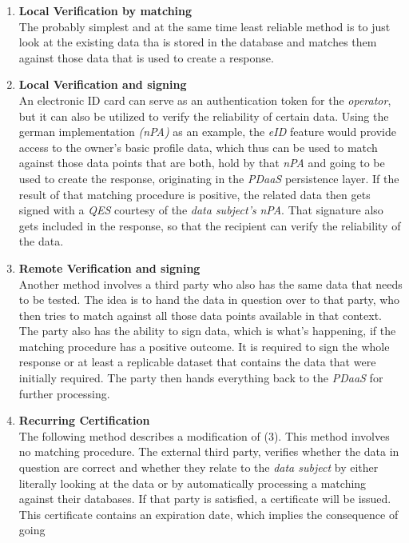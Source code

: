 \documentclass[12pt,english,a4paper,titlepage,cleardoublepage=empty,dottedtoc]{report}
\begin{document}
\begin{enumerate}
\def\labelenumi{(\arabic{enumi})}
\item
  \textbf{Local Verification by matching}\\
  The probably simplest and at the same time least reliable method is to
  just look at the existing data tha is stored in the database and
  matches them against those data that is used to create a response.
\item
  \textbf{Local Verification and signing}\\
  An electronic ID card can serve as an authentication token for the
  \emph{operator}, but it can also be utilized to verify the reliability
  of certain data. Using the german implementation \emph{(nPA)} as an
  example, the \emph{eID} feature would provide access to the owner's
  basic profile data, which thus can be used to match against those data
  points that are both, hold by that \emph{nPA} and going to be used to
  create the response, originating in the \emph{PDaaS} persistence
  layer. If the result of that matching procedure is positive, the
  related data then gets signed with a \emph{QES} courtesy of the
  \emph{data subject's} \emph{nPA}. That signature also gets included in
  the response, so that the recipient can verify the reliability of the
  data.
\item
  \textbf{Remote Verification and signing}\\
  Another method involves a third party who also has the same data that
  needs to be tested. The idea is to hand the data in question over to
  that party, who then tries to match against all those data points
  available in that context. The party also has the ability to sign
  data, which is what's happening, if the matching procedure has a
  positive outcome. It is required to sign the whole response or at
  least a replicable dataset that contains the data that were initially
  required. The party then hands everything back to the \emph{PDaaS} for
  further processing.
\item
  \textbf{Recurring Certification}\\
  The following method describes a modification of (3). This method
  involves no matching procedure. The external third party, verifies
  whether the data in question are correct and whether they relate to
  the \emph{data subject} by either literally looking at the data or by
  automatically processing a matching against their databases. If that
  party is satisfied, a certificate will be issued. This certificate
  contains an expiration date, which implies the consequence of going

\end{enumerate}
\end{document}
